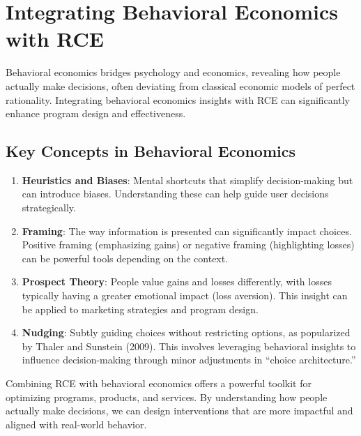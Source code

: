 \documentclass[
  letterpaper,
  DIV=11,
  numbers=noendperiod]{scrreprt}
\begin{document}
\section{Integrating Behavioral Economics with
RCE}\label{integrating-behavioral-economics-with-rce}

Behavioral economics bridges psychology and economics, revealing how
people actually make decisions, often deviating from classical economic
models of perfect rationality. Integrating behavioral economics insights
with RCE can significantly enhance program design and effectiveness.

\subsection{Key Concepts in Behavioral
Economics}\label{key-concepts-in-behavioral-economics}

\begin{enumerate}
\def\labelenumi{\arabic{enumi}.}
\item
  \textbf{Heuristics and Biases}: Mental shortcuts that simplify
  decision-making but can introduce biases. Understanding these can help
  guide user decisions strategically.
\item
  \textbf{Framing}: The way information is presented can significantly
  impact choices. Positive framing (emphasizing gains) or negative
  framing (highlighting losses) can be powerful tools depending on the
  context.
\item
  \textbf{Prospect Theory}: People value gains and losses differently,
  with losses typically having a greater emotional impact (loss
  aversion). This insight can be applied to marketing strategies and
  program design.
\item
  \textbf{Nudging}: Subtly guiding choices without restricting options,
  as popularized by Thaler and Sunstein (2009). This involves leveraging
  behavioral insights to influence decision-making through minor
  adjustments in ``choice architecture.''
\end{enumerate}

\begin{tcolorbox}[enhanced jigsaw, colframe=quarto-callout-note-color-frame, left=2mm, toprule=.15mm, colbacktitle=quarto-callout-note-color!10!white, title=\textcolor{quarto-callout-note-color}{\faInfo}\hspace{0.5em}{Key Takeaway}, coltitle=black, rightrule=.15mm, leftrule=.75mm, colback=white, arc=.35mm, bottomtitle=1mm, bottomrule=.15mm, breakable, titlerule=0mm, opacitybacktitle=0.6, toptitle=1mm, opacityback=0]

Combining RCE with behavioral economics offers a powerful toolkit for
optimizing programs, products, and services. By understanding how people
actually make decisions, we can design interventions that are more
impactful and aligned with real-world behavior.

\end{tcolorbox}
\end{document}

